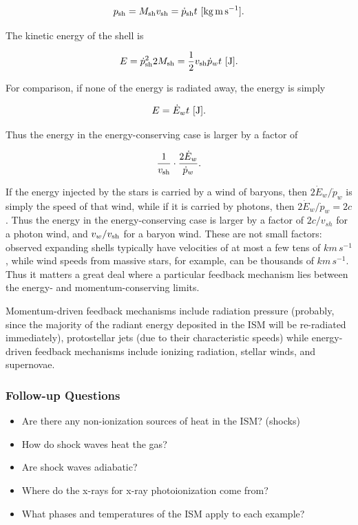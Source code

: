 \documentclass[a4paper,10pt]{article}
\begin{document}
\begin{align*}
    p_{\rm sh} = M_{\rm sh}v_{\rm sh} = \dot{p}_{\rm sh}t ~ [{\rm kg\,m\,s^{-1}}].
\end{align*}

{\noindent}The kinetic energy of the shell is

\begin{align*}
    E = \dot{p}_{\rm sh}^2 2M_{\rm sh} = \frac{1}{2}v_{\rm sh}\dot{p}_wt ~ [{\rm J}].
\end{align*}

For comparison, if none of the energy is radiated away, the energy is simply

\begin{align*}
    E = \dot{E}_wt ~ [{\rm J}].
\end{align*}

{\noindent}Thus the energy in the energy-conserving case is larger by a factor of

\begin{align*}
    \frac{1}{v_{\rm sh}}\cdot\frac{2\dot{E}_w}{\dot{p}_w}.
\end{align*}

{\noindent}If the energy injected by the stars is carried by a wind of baryons, then $2\dot{E}_w/\dot{p}_w$ is simply the speed of that wind, while if it is carried by photons, then $2\dot{E}_w/\dot{p}_w=2c$. Thus the energy in the energy-conserving case is larger by a factor of $2c/v_{sh}$ for a photon wind, and $v_w/v_{\rm sh}$ for a baryon wind. These are not small factors: observed expanding shells typically have velocities of at most a few tens of $km\,s^{-1}$, while wind speeds from massive stars, for example, can be thousands of $km\,s^{-1}$. Thus it matters a great deal where a particular feedback mechanism lies between the energy- and momentum-conserving limits.

{\noindent}Momentum-driven feedback mechanisms include radiation pressure (probably, since the majority of the radiant energy deposited in the ISM will be re-radiated immediately), protostellar jets (due to their characteristic speeds) while energy-driven feedback mechanisms include ionizing radiation, stellar winds, and supernovae.

\subsubsection{Follow-up Questions}

\begin{itemize}
    \item Are there any non-ionization sources of heat in the ISM? (shocks)
    \item How do shock waves heat the gas?
    \item Are shock waves adiabatic?
    \item Where do the x-rays for x-ray photoionization come from?
    \item What phases and temperatures of the ISM apply to each example?
\end{itemize}
\end{document}
